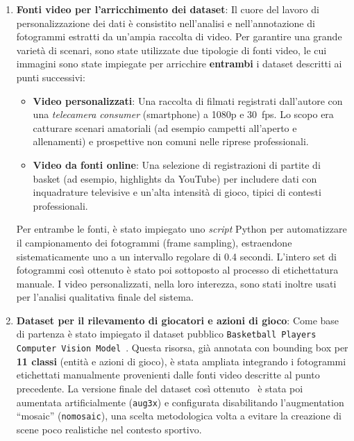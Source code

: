 \documentclass[12pt,a4paper,openright,twoside]{book}
\begin{document}
\begin{enumerate}
  \item \textbf{Fonti video per l'arricchimento dei dataset}:
  Il cuore del lavoro di personalizzazione dei dati è consistito 
  nell'analisi e nell'annotazione di fotogrammi estratti da 
  un'ampia raccolta di video. Per garantire una grande varietà di 
  scenari, sono state utilizzate due tipologie di fonti video, 
  le cui immagini sono state impiegate per arricchire 
  \textbf{entrambi} i dataset descritti ai punti successivi:
  \begin{itemize}
    \item \textbf{Video personalizzati}: Una raccolta di 
    filmati registrati dall'autore con una \emph{telecamera 
    consumer} (smartphone) a 1080p e 30~fps. Lo scopo era 
    catturare scenari amatoriali (ad esempio campetti 
    all'aperto e allenamenti) e prospettive non comuni nelle 
    riprese professionali.
    \item \textbf{Video da fonti online}: Una selezione di 
    registrazioni di partite di basket (ad esempio, 
    highlights da YouTube) per includere dati con 
    inquadrature televisive e un'alta intensità di gioco, 
    tipici di contesti professionali.
  \end{itemize}
  Per entrambe le fonti, è stato impiegato uno \emph{script} Python 
  per automatizzare il campionamento dei fotogrammi 
  (frame sampling), estraendone sistematicamente uno a un 
  intervallo regolare di 0.4 secondi. L'intero set di 
  fotogrammi così ottenuto è stato poi sottoposto al processo 
  di etichettatura manuale. I video personalizzati, nella loro 
  interezza, sono stati inoltre usati per l'analisi qualitativa 
  finale del sistema.


  \item \textbf{Dataset per il rilevamento di giocatori e azioni di gioco}:
  Come base di partenza è stato impiegato il dataset pubblico 
  \texttt{Basketball Players Computer Vision Model}~\cite{Basketball-Player-Detection-2_Dataset}. 
  Questa risorsa, già annotata con bounding box per 
  \textbf{11 classi} (entità e azioni di gioco), è stata 
  ampliata integrando i fotogrammi etichettati manualmente 
  provenienti dalle fonti video descritte al punto precedente. 
  La versione finale del dataset così 
  ottenuto~\cite{Basketball-Player-Detection-2-68vvt_Dataset} è 
  stata poi aumentata artificialmente (\texttt{aug3x}) e 
  configurata disabilitando l'augmentation ``mosaic'' 
  (\texttt{nomosaic}), una scelta metodologica volta a evitare 
  la creazione di scene poco realistiche nel contesto sportivo.


\end{enumerate}
\end{document}
